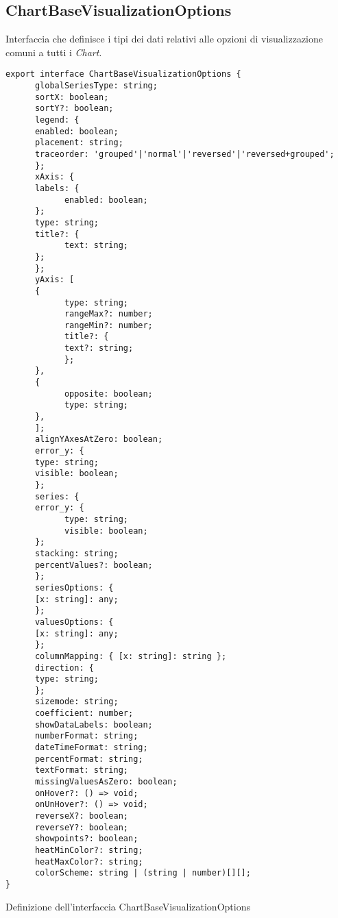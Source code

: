 \subsection{ChartBaseVisualizationOptions}
Interfaccia che definisce i tipi dei dati relativi alle opzioni di visualizzazione comuni a tutti i \textit{Chart}.
\begin{verbatim}
export interface ChartBaseVisualizationOptions {
      globalSeriesType: string; 
      sortX: boolean;
      sortY?: boolean;
      legend: {
      enabled: boolean;
      placement: string;
      traceorder: 'grouped'|'normal'|'reversed'|'reversed+grouped';
      };
      xAxis: {
      labels: {
            enabled: boolean;
      };
      type: string;
      title?: {
            text: string;
      };
      };
      yAxis: [
      {
            type: string;
            rangeMax?: number;
            rangeMin?: number;
            title?: {
            text?: string;
            };
      },
      {
            opposite: boolean;
            type: string;
      },
      ];
      alignYAxesAtZero: boolean;
      error_y: {
      type: string;
      visible: boolean;
      };
      series: {
      error_y: {
            type: string;
            visible: boolean;
      };
      stacking: string;
      percentValues?: boolean;
      };
      seriesOptions: {
      [x: string]: any;
      };
      valuesOptions: {
      [x: string]: any;
      };
      columnMapping: { [x: string]: string };
      direction: {
      type: string;
      };
      sizemode: string;
      coefficient: number;
      showDataLabels: boolean;
      numberFormat: string;
      dateTimeFormat: string;
      percentFormat: string;
      textFormat: string;
      missingValuesAsZero: boolean;
      onHover?: () => void;
      onUnHover?: () => void;
      reverseX?: boolean;
      reverseY?: boolean;
      showpoints?: boolean;
      heatMinColor?: string;
      heatMaxColor?: string;
      colorScheme: string | (string | number)[][];
}
\end{verbatim}
\begin{listing}[H]
      \caption{Definizione dell'interfaccia ChartBaseVisualizationOptions}
      \label{listing:chartBaseVisualizationOptions}
\end{listing}
